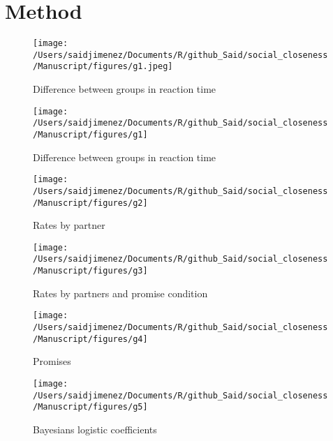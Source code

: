 \documentclass[12pt,]{article}
\begin{document}
\section{Method}\label{method}

\begin{figure}
\centering
\texttt{[image: /Users/saidjimenez/Documents/R/github\_Said/social\_closeness/Manuscript/figures/g1.jpeg]}
\caption{Difference between groups in reaction time}
\end{figure}

\begin{figure}

{\centering \texttt{[image: /Users/saidjimenez/Documents/R/github\_Said/social\_closeness/Manuscript/figures/g1]} 

}

\caption{Difference between groups in reaction time}\label{fig:g1}
\end{figure}

\begin{figure}

{\centering \texttt{[image: /Users/saidjimenez/Documents/R/github\_Said/social\_closeness/Manuscript/figures/g2]} 

}

\caption{Rates by partner}\label{fig:g2}
\end{figure}

\begin{figure}

{\centering \texttt{[image: /Users/saidjimenez/Documents/R/github\_Said/social\_closeness/Manuscript/figures/g3]} 

}

\caption{Rates by partners and promise condition}\label{fig:g3}
\end{figure}

\begin{figure}

{\centering \texttt{[image: /Users/saidjimenez/Documents/R/github\_Said/social\_closeness/Manuscript/figures/g4]} 

}

\caption{Promises}\label{fig:g4}
\end{figure}

\begin{figure}

{\centering \texttt{[image: /Users/saidjimenez/Documents/R/github\_Said/social\_closeness/Manuscript/figures/g5]} 

}

\caption{Bayesians logistic coefficients}\label{fig:g5}
\end{figure}
\end{document}

